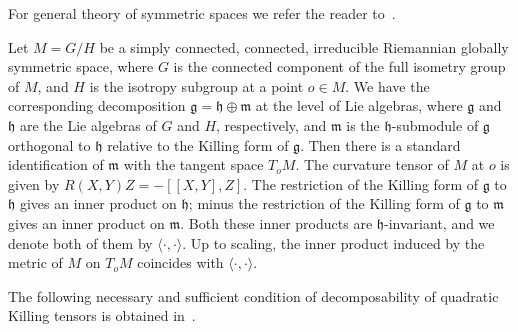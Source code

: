 \documentclass[12pt,reqno]{amsart}
\newcommand\g{\mathfrak g}
\newcommand\h{\mathfrak h}
\newcommand\m{\mathfrak m}
\newcommand \<{\langle}
\renewcommand \>{\rangle}
\newcommand \ip{\<\cdot,\cdot\>}
\theoremstyle{definition}
\theoremstyle{remark}
\begin{document}
	For general theory of symmetric spaces we refer the reader to~\cite{Hel,Wolf}.
	
	Let $M=G/H$ be a simply connected, connected, irreducible Riemannian globally symmetric space, where $G$ is the connected component of the full isometry group of $M$, and $H$ is the isotropy subgroup at a point $o \in M$. We have the corresponding decomposition $\g = \h \oplus \m$ at the level of Lie algebras, where $\g$ and $\h$ are the Lie algebras of $G$ and $H$, respectively, and $\m$ is the $\h$-submodule of $\g$ orthogonal to $\h$ relative to the Killing form of $\g$. Then there is a standard identification of $\m$ with the tangent space $T_oM$. The curvature tensor of $M$ at $o$ is given by $R(X,Y)Z = -[[X,Y],Z]$. The restriction of the Killing form of $\g$ to $\h$ gives an inner product on $\h$; minus the restriction of the Killing form of $\g$ to $\m$ gives an inner product on $\m$. Both these inner products are $\h$-invariant, and we denote both of them by $\ip$. Up to scaling, the inner product induced by the metric of $M$ on $T_oM$ coincides with $\ip$.
	
	The following necessary and sufficient condition of decomposability of quadratic Killing tensors is obtained in~\cite[Theorem~3, Remark~2]{MN2}.
	
\end{document}
